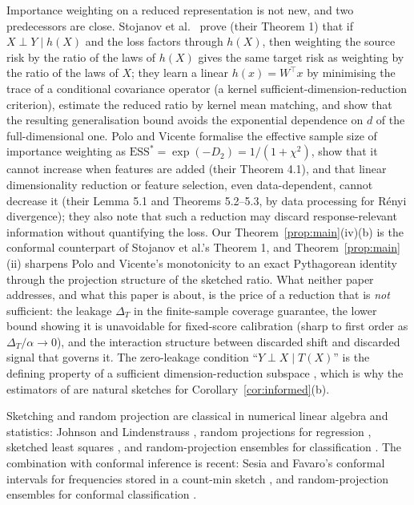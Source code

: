\documentclass[11pt,a4paper]{article}
\theoremstyle{plain}
\theoremstyle{definition}
\theoremstyle{remark}
\begin{document}
Importance weighting on a reduced representation is not new, and two predecessors are close. Stojanov et al.\ \cite{stojanov2019} prove (their Theorem 1) that if $X\perp Y\mid h(X)$ and the loss factors through $h(X)$, then weighting the source risk by the ratio of the laws of $h(X)$ gives the same target risk as weighting by the ratio of the laws of $X$; they learn a linear $h(x)=W^{\!\top}x$ by minimising the trace of a conditional covariance operator (a kernel sufficient-dimension-reduction criterion), estimate the reduced ratio by kernel mean matching, and show that the resulting generalisation bound avoids the exponential dependence on $d$ of the full-dimensional one. Polo and Vicente \cite{polo2022} formalise the effective sample size of importance weighting as $\mathrm{ESS}^\ast=\exp(-D_2)=1/(1+\chi^2)$, show that it cannot increase when features are added (their Theorem 4.1), and that linear dimensionality reduction or feature selection, even data-dependent, cannot decrease it (their Lemma 5.1 and Theorems 5.2--5.3, by data processing for R\'enyi divergence); they also note that such a reduction may discard response-relevant information without quantifying the loss. Our Theorem~\ref{prop:main}(iv)(b) is the conformal counterpart of Stojanov et al.'s Theorem 1, and Theorem~\ref{prop:main}(ii) sharpens Polo and Vicente's monotonicity to an exact Pythagorean identity through the projection structure of the sketched ratio. What neither paper addresses, and what this paper is about, is the price of a reduction that is \emph{not} sufficient: the leakage $\Delta_T$ in the finite-sample coverage guarantee, the lower bound showing it is unavoidable for fixed-score calibration (sharp to first order as $\Delta_T/\alpha\to0$), and the interaction structure between discarded shift and discarded signal that governs it. The zero-leakage condition ``$Y\perp X\mid T(X)$'' is the defining property of a sufficient dimension-reduction subspace \cite{li1991,cook1998}, which is why the estimators of \cite{stojanov2019} are natural sketches for Corollary~\ref{cor:informed}(b).

Sketching and random projection are classical in numerical linear algebra and statistics: Johnson and Lindenstrauss \cite{jl1984,dasgupta2003}, random projections for regression \cite{maillard2012}, sketched least squares \cite{raskutti2016}, and random-projection ensembles for classification \cite{cannings2017}. The combination with conformal inference is recent: Sesia and Favaro's conformal intervals for frequencies stored in a count-min sketch \cite{sesia2022}, and random-projection ensembles for conformal classification \cite{rpconformal2024}.
\end{document}
